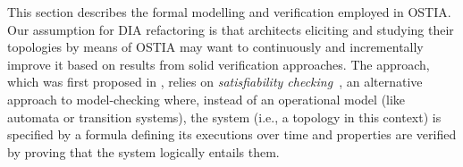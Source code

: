 \documentclass[smallextended]{svjour3}       %
\begin{document}
\newcommand{\visit}[1]{\mathit{visit}(#1)}
\newcommand{\inv}[1]{\mathit{inv}(q_{#1})}


\newcommand{\intg}[1]{\lfloor#1\rfloor}
\newcommand{\fract}[1]{\mathit{frac(#1)}}





\newcommand{\ori}{\mathtt{orig}}
\newcommand{\p}[1]{\mathtt{process}_{#1}}
\newcommand{\ta}[1]{\mathtt{take}_{#1}}
\newcommand{\e}[1]{\mathtt{emit}_{#1}}
\newcommand{\add}[1]{\mathtt{add}_{#1}}
\newcommand{\f}[1]{\mathtt{fail}_{#1}}
\newcommand{\buf}[1]{\mathtt{buffer}_{#1}}
\newcommand{\startf}[1]{\mathtt{startFailure}_{#1}}
\newcommand{\startid}[1]{\mathtt{startIdle}_{#1}}
\newcommand{\id}[1]{\mathtt{idle}_{#1}}
\newcommand{\cl}[1]{\mathtt{clock}_{#1}}
\newcommand{\cltf}[1]{ \cl{to\f{#1}}}
\newcommand{\ph}[1]{\mathtt{phase}_{#1}}

\newcommand{\pr}[2]{\p{#1}(#2)}
\newcommand{\tar}[2]{\ta{#1}(#2)}
\newcommand{\er}[2]{\e{#1}(#2)}
\newcommand{\addr}[2]{\add{#1}(#2)}
\newcommand{\ra}[1]{r_{\add{#1}}}
\newcommand{\rp}[1]{r_{\p{#1}}}
\newcommand{\re}[1]{r_{\e{#1}}}
\newcommand{\rt}[1]{r_{\ta{#1}}}
\newcommand{\rf}[1]{r_{\mathtt{failure}_{#1}}}
\newcommand{\rff}[2]{r_{\mathtt{failure}_{#1#2}}}
\newcommand{\rr}[1]{r_{\mathtt{replay}_{#1}}}
\newcommand{\reb}[1]{\bar{r}_{\e{#1}}}
\newcommand{\rth}[1]{\hat{r}_{\ta{#1}}}
\newcommand{\reh}[1]{\hat{r}_{\e{#1}}}

\newcommand{\tph}[2]{t_{\ph{#1}}^{#2} }

	

This section describes the formal modelling and verification employed in OSTIA. Our assumption for DIA refactoring is that architects eliciting and studying their topologies by means of OSTIA may want to continuously and incrementally improve it based on results from solid verification approaches. The approach, which was first proposed in \cite{MBER16}, relies on \textit{satisfiability checking}~\cite{MPS13}, an alternative approach to model-checking where, instead of an operational model (like automata or transition systems), the system (i.e., a topology in this context) is specified by a formula defining its executions over time and properties are verified by proving that the system logically entails them.
\end{document}
